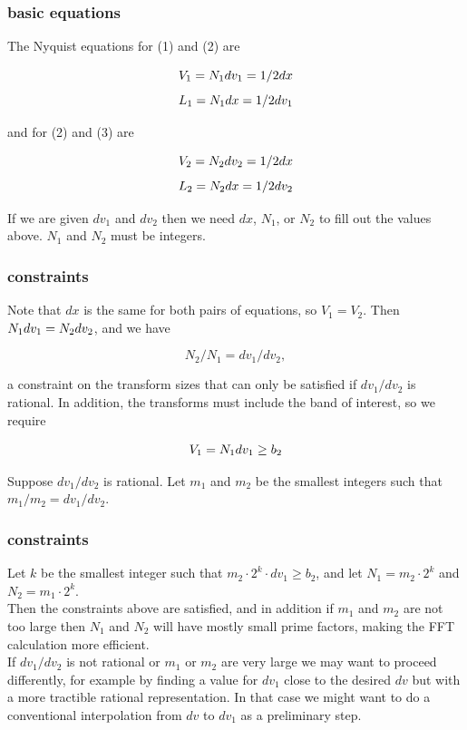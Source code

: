 \documentclass[11pt]{beamer}
\begin{document}
\begin{frame}
\frametitle{basic equations}

The Nyquist equations for (1) and (2) are

\[ V_1 = N_1 \/dv_1 = 1/ 2\/dx \]
\[ L_1 = N_1 \/dx   = 1/ 2\/dv_1 \]

and for (2) and (3) are

\[ V_2 = N_2 \/dv_2 = 1/ 2\/dx \]
\[ L_2 = N_2 \/dx   = 1/ 2\/dv_2 \]

If we are given $dv_1$ and $dv_2$ then we need $dx$, $N_1$, or $N_2$
to fill out the values above.  $N_1$ and $N_2$ must be integers.

\end{frame}
\begin{frame}
\frametitle{constraints}

Note that $dx$ is the same for both pairs of equations, so $V_1 =
V_2$.  Then $N_1\/dv_1 = N_2\/dv_2$, and we have

\[ N_2 / N_1 = dv_1 / dv_2, \]

a constraint on the transform sizes that can only be satisfied if
$dv_1 / dv_2$ is rational.  In addition, the transforms must include
the band of interest, so we require 

\[ V_1 = N_1\/dv_1 \ge b_2 \]

Suppose $dv_1 / dv_2$ is rational.  Let $m_1$ and $m_2$ be the smallest
integers such that $m_1/m_2 = dv_1 / dv_2$. \\

\end{frame}
\begin{frame}
\frametitle{constraints}

Let $k$ be the smallest integer such that $m_2 \cdot 2^k \cdot dv_1
\ge b_2$, and let $N_1 = m_2 \cdot 2^k$ and $N_2 = m_1 \cdot 2^k$. \\
\bigskip
Then the constraints above are satisfied, and in addition if $m_1$
and $m_2$ are not too large then $N_1$ and $N_2$ will have mostly
small prime factors, making the FFT calculation more efficient. \\
\bigskip
If $dv_1 / dv_2$ is not rational or $m_1$ or $m_2$ are very large we
may want to proceed differently, for example by finding a value for
$dv_1$ close to the desired $dv$ but with a more tractible rational
representation.  In that case we might want to do a conventional
interpolation from $dv$ to $dv_1$ as a preliminary step.

\end{frame}
\end{document}
